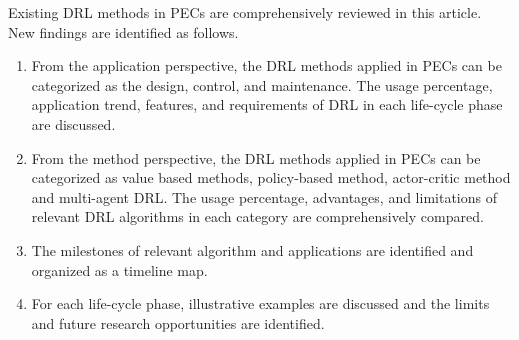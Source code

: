 Existing DRL methods in PECs are comprehensively reviewed in this article. New findings are identified as follows.
\begin{enumerate}
\item From the application perspective, the DRL methods applied in PECs can be categorized as the design, control, and maintenance. The usage percentage, application trend, features, and requirements of DRL in each life-cycle phase are discussed.
\item From the method perspective, the DRL methods applied in PECs can be categorized as value based methods, policy-based method, actor-critic method and multi-agent DRL. The usage percentage, advantages, and limitations of relevant DRL algorithms in each category are comprehensively compared.
\item The milestones of relevant algorithm and applications are identified and organized as a timeline map.
\item For each life-cycle phase, illustrative examples are discussed and the limits and future research opportunities are identified.
\end{enumerate}